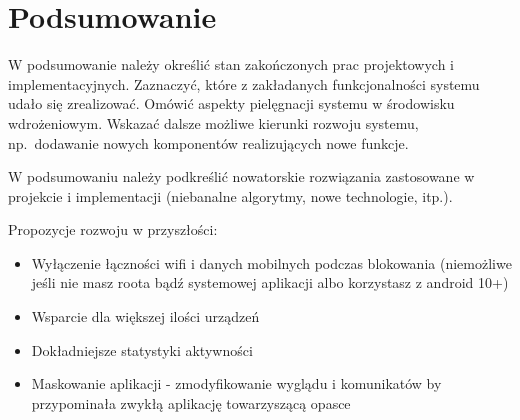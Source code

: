 \chapter{Podsumowanie}
\thispagestyle{chapterBeginStyle}

W podsumowanie należy określić stan zakończonych prac projektowych i implementacyjnych. Zaznaczyć, które z zakładanych funkcjonalności systemu udało się zrealizować. Omówić aspekty pielęgnacji systemu w środowisku wdrożeniowym. Wskazać dalsze możliwe kierunki rozwoju systemu, np.\ dodawanie nowych komponentów realizujących nowe funkcje.

W podsumowaniu należy podkreślić nowatorskie rozwiązania zastosowane w projekcie i implementacji (niebanalne algorytmy, nowe technologie, itp.).

Propozycje rozwoju w przyszłości:
\begin{itemize}
    \item Wyłączenie łączności wifi i danych mobilnych podczas blokowania (niemożliwe jeśli nie masz roota bądź systemowej aplikacji albo korzystasz z android 10+)
    \item Wsparcie dla większej ilości urządzeń
    \item Dokładniejsze statystyki aktywności
    \item Maskowanie aplikacji - zmodyfikowanie wyglądu i komunikatów by przypominała zwykłą aplikację towarzyszącą opasce
\end{itemize}



